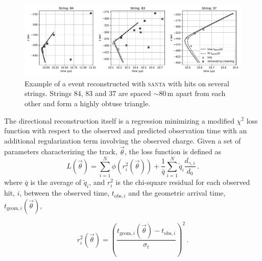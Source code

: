 \begin{figure}
    \centering
    \includegraphics[width=\linewidth]{figures/icecube/reconstruction/santa/multi_string_example_with_cleaning_id_12607962.pdf}
    \caption{Example of a \numucc event reconstructed with \textsc{santa} with hits on several strings. Strings 84, 83 and 37 are spaced $\sim80\,\mathrm{m}$ apart from each other and form a highly obtuse triangle.}
    \label{fig:santa-multi-string-example}
\end{figure}

The directional reconstruction itself is a regression minimizing a modified $\chi^2$ loss function with respect to the observed and predicted observation time with an additional regularization term involving the observed charge. Given a set of parameters characterizing the track, $\vec{\theta}$, the loss function is defined as
\begin{equation}
L(\vec{\theta})=\sum_{i=1}^{N}\phi(r^2_i(\vec{\theta}))
+
\frac{1}{\bar{q}}\sum_{i=1}^{N}\tilde{q}_i \frac{d_{\gamma,i}}{d_0}\,.\label{eq:chi-square-mod-loss}
\end{equation}
where $\bar{q}$ is the average of $\tilde{q}_i$, and $r^2_i$ is the chi-square residual for each observed hit, $i$, between the observed time, $t_{\mathrm{obs}, i}$ and the geometric arrival time, $t_{\mathrm{geom},i}(\vec{\theta})$,

\begin{equation}
r_{i}^{2}(\vec{\theta})=\left(\frac{t_{\mathrm{geom},i}(\vec{\theta})-t_{\mathrm{obs},i}}{\sigma_{t}}\right)^{2}\,.
\end{equation}

